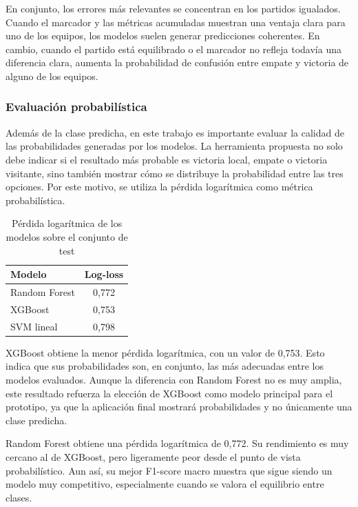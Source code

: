 En conjunto, los errores más relevantes se concentran en los partidos igualados. Cuando el marcador y las métricas acumuladas muestran una ventaja clara para uno de los equipos, los modelos suelen generar predicciones coherentes. En cambio, cuando el partido está equilibrado o el marcador no refleja todavía una diferencia clara, aumenta la probabilidad de confusión entre empate y victoria de alguno de los equipos.

\subsubsection*{Evaluación probabilística}

Además de la clase predicha, en este trabajo es importante evaluar la calidad de las probabilidades generadas por los modelos. La herramienta propuesta no solo debe indicar si el resultado más probable es victoria local, empate o victoria visitante, sino también mostrar cómo se distribuye la probabilidad entre las tres opciones. Por este motivo, se utiliza la pérdida logarítmica como métrica probabilística.

\begin{table}[H]
    \centering
    \begin{tabular}{lc}
        \hline
        \textbf{Modelo} & \textbf{Log-loss} \\
        \hline
        Random Forest   & 0,772             \\
        XGBoost         & 0,753             \\
        SVM lineal      & 0,798             \\
        \hline
    \end{tabular}
    \caption{Pérdida logarítmica de los modelos sobre el conjunto de test}
    \label{tab:logloss_modelos}
\end{table}

XGBoost obtiene la menor pérdida logarítmica, con un valor de 0,753. Esto indica que sus probabilidades son, en conjunto, las más adecuadas entre los modelos evaluados. Aunque la diferencia con Random Forest no es muy amplia, este resultado refuerza la elección de XGBoost como modelo principal para el prototipo, ya que la aplicación final mostrará probabilidades y no únicamente una clase predicha.

Random Forest obtiene una pérdida logarítmica de 0,772. Su rendimiento es muy cercano al de XGBoost, pero ligeramente peor desde el punto de vista probabilístico. Aun así, su mejor F1-score macro muestra que sigue siendo un modelo muy competitivo, especialmente cuando se valora el equilibrio entre clases.

